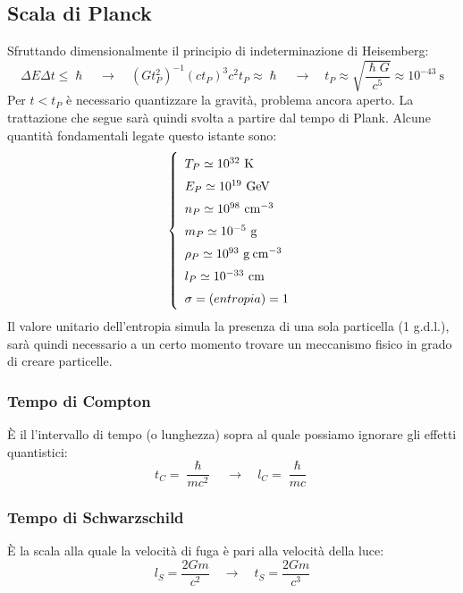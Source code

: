 \subsection{Scala di Planck}
Sfruttando dimensionalmente il principio di indeterminazione di Heisemberg:
$$
\Delta E \Delta t \leq \hslash \quad \rightarrow \quad (G t_P^2)^{-1} (c t_P)^{3}c^2 t_P \approx \hslash \quad \rightarrow \quad t_P \approx \sqrt{\frac{\hslash G}{c^5}} \approx 10^{-43}~\mathrm{s}
$$
Per $t<t_P$ è necessario quantizzare la gravità, problema ancora aperto. La trattazione che segue sarà quindi svolta a partire dal tempo di Plank. Alcune quantità fondamentali legate questo istante sono:
\begin{equation}\left\{
    \def\arraystretch{1.5}
        \begin{array}{ll}
        T_P \simeq 10^{32}~\mathrm{K} \\
        E_P \simeq 10^{19}~\mathrm{GeV} \\
        n_P \simeq 10^{98}~\mathrm{cm}^{-3} \\
        m_P \simeq 10^{-5}~\mathrm{g} \\
        \rho_P \simeq 10^{93}~\mathrm{g\: cm}^{-3}  \\
        l_P \simeq 10^{-33}~\mathrm{cm} \\
        \sigma = (entropia) = 1 
    \end{array}\right. \label{eq:unitaplanckiane}
\end{equation}
Il valore unitario dell'entropia simula la presenza di una sola particella (1 g.d.l.), sarà quindi necessario a un certo momento trovare un meccanismo fisico in grado di creare particelle.  

\subsubsection{Tempo di Compton}
È il l'intervallo di tempo (o lunghezza) sopra al quale possiamo ignorare gli effetti quantistici:
\begin{equation}
    t_C = \frac{\hslash}{mc^2} \quad \rightarrow \quad l_C =  \frac{\hslash}{mc}
\end{equation}

\subsubsection{Tempo di Schwarzschild}
È la scala alla quale la velocità di fuga è pari alla velocità della luce:
\begin{equation}
    l_S =  \frac{2Gm}{c^2}  \quad \rightarrow \quad   t_S = \frac{2Gm}{c^3} 
\end{equation}


